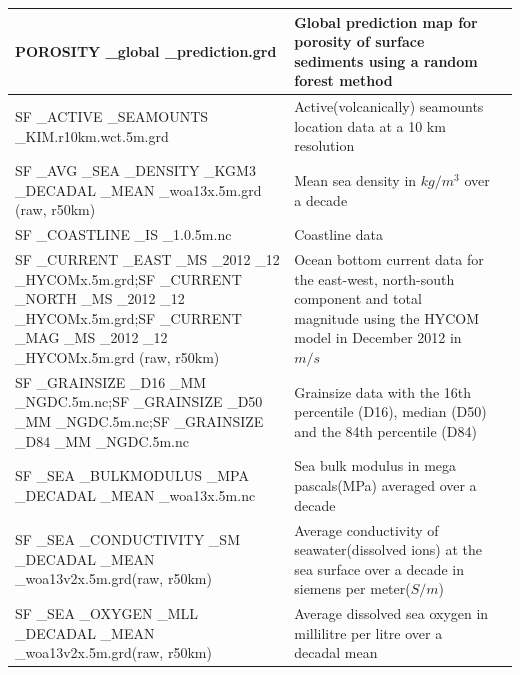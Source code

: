 \documentclass[journal abbreviation, manuscript]{copernicus}
\begin{document}
\begin{longtable}{|p{}|p{}|p{}|}
        \hline 
        POROSITY \_global \_prediction.grd & Global prediction map for porosity of surface sediments using a random forest method  & \cite{Martin2005Porosity} \\
        \hline 
        SF \_ACTIVE \_SEAMOUNTS \_KIM.r10km.wct.5m.grd & Active(volcanically) seamounts location data at a 10 km resolution & \cite{KIM2011} \\
        \hline 
        SF \_AVG \_SEA \_DENSITY \_KGM3 \_DECADAL \_MEAN \_woa13x.5m.grd (raw, r50km)& Mean sea density in $kg/m^3$ over a decade &  \cite{WOA13X2013}\\
        \hline 
        SF \_COASTLINE \_IS \_1.0.5m.nc & Coastline data &  \cite{lee_2020_3675364}\\
        \hline 
        SF \_CURRENT \_EAST \_MS \_2012 \_12 \_HYCOMx.5m.grd;SF \_CURRENT \_NORTH \_MS \_2012 \_12 \_HYCOMx.5m.grd;SF \_CURRENT \_MAG \_MS \_2012 \_12 \_HYCOMx.5m.grd (raw, r50km)& Ocean bottom current data for the east-west, north-south component and total magnitude using the HYCOM model in December 2012 in $m/s$ & \cite{HYCOM2014} \\
        \hline  
        SF \_GRAINSIZE \_D16 \_MM \_NGDC.5m.nc;SF \_GRAINSIZE \_D50 \_MM \_NGDC.5m.nc;SF \_GRAINSIZE \_D84 \_MM \_NGDC.5m.nc & Grainsize data with the 16th percentile (D16), median (D50) and the 84th percentile (D84) & \cite{ngdc1976} \\
        \hline 
        SF \_SEA \_BULKMODULUS \_MPA \_DECADAL \_MEAN \_woa13x.5m.nc & Sea bulk modulus in mega pascals(MPa) averaged over a decade & \cite{WOA13X2013} \\
        \hline 
        SF \_SEA \_CONDUCTIVITY \_SM \_DECADAL \_MEAN \_woa13v2x.5m.grd(raw, r50km)  & Average conductivity of seawater(dissolved ions) at the sea surface over a decade in siemens per meter($S/m$) & \cite{WOA13X2013} \\
        \hline 
        SF \_SEA \_OXYGEN \_MLL \_DECADAL \_MEAN \_woa13v2x.5m.grd(raw, r50km) & Average dissolved sea oxygen in millilitre per litre over a decadal mean & \cite{WOA13X2013} \\
        \hline 


\end{longtable}
\end{document}
